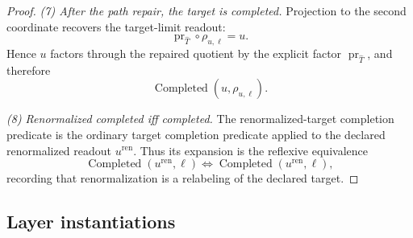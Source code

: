 \documentclass[11pt]{article}
\theoremstyle{definition}
\begin{document}
\begin{proof}
\emph{(7) After the path repair, the target is completed.}
Projection to the second coordinate recovers the target-limit readout:
\[
  \operatorname{pr}_{\widehat T}\circ\rho_{u,\ell}=u.
\]
Hence \(u\) factors through the repaired quotient by the explicit
factor \(\operatorname{pr}_{\widehat T}\), and therefore
\[
  \operatorname{Completed}(u,\rho_{u,\ell}).
\]

\emph{(8) Renormalized completed iff completed.}
The renormalized-target completion predicate is the ordinary target
completion predicate applied to the declared renormalized readout
\(u^{\mathrm{ren}}\).  Thus its expansion is the reflexive
equivalence
\[
  \operatorname{Completed}(u^{\mathrm{ren}},\ell)
  \iff
  \operatorname{Completed}(u^{\mathrm{ren}},\ell),
\]
recording that renormalization is a relabeling of the declared target.
\end{proof}

\subsection*{Layer instantiations}\label{layer-inst:F36}
\end{document}

